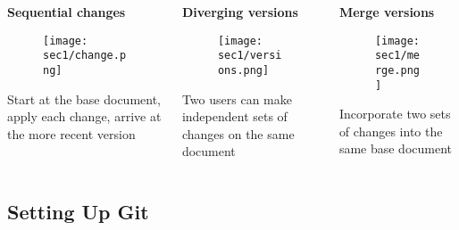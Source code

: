 \begin{frame}[fragile]
\emptyframetitle
  \begin{columns}
    \begin{column}{0.33\textwidth}
{\bf Sequential changes}
      \begin{figure}[h]
      \texttt{[image: sec1/change.png]}
      \end{figure}
      Start at the base document, apply each change, arrive at the more recent version
    \end{column}
    \begin{column}{0.33\textwidth}
{\bf Diverging versions}
      \begin{figure}[h]
      \texttt{[image: sec1/versions.png]}
      \end{figure}
      Two users can make independent sets of changes on the same document
    \end{column}
    \begin{column}{0.33\textwidth}
{\bf Merge versions}
      \begin{figure}[h]
      \texttt{[image: sec1/merge.png]}
      \end{figure}
      Incorporate two sets of changes into the same base document
    \end{column}

  \end{columns}

\end{frame}


\subsection{Setting Up Git}\hypertarget{sec1.2}{}


